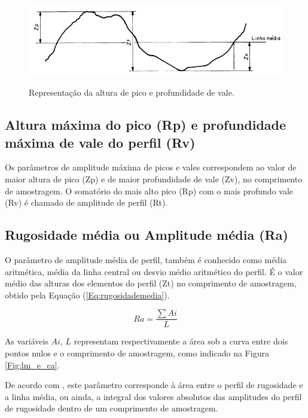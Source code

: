 \begin{figure}[!ht]
\centering
{\includegraphics[scale=0.65]{figures/alturas.jpg}}\\\caption{Representação da altura de pico e profundidade de vale.}
 \label{Fig:alturas}
\end{figure}

\subsection{Altura máxima do pico (Rp) e profundidade máxima de vale do perfil (Rv)}
Os parâmetros de amplitude máxima de picos e vales correspondem ao valor de maior altura de pico (Zp) e de maior profundidade de vale (Zv), no comprimento de amostragem. 
O somatório do mais alto pico (Rp) com o mais profundo vale (Rv) é chamado de amplitude de perfil (Rt). 

\subsection{Rugosidade média ou Amplitude média (Ra)}
O parâmetro de amplitude média de perfil, também é conhecido como média aritmética, média da linha central ou desvio médio aritmético do perfil.
É o valor médio das alturas dos elementos do perfil (Zt) no comprimento de amostragem, obtido pela Equação (\ref{Eq:rugosidademedia}).

\begin{equation}\label{Eq:rugosidademedia}
%
Ra = \frac{\sum Ai}{L}
%
\end{equation}
%

As variáveis $Ai$, $L$ representam respectivamente a área sob a curva entre dois pontos nulos e o comprimento de amostragem, como indicado na Figura \ref{Fig:lm_e_ca}. 

De acordo com , este parâmetro corresponde à área entre o perfil de rugosidade e a linha média, ou ainda, a integral dos valores absolutos das amplitudes do perfil de rugosidade dentro de um comprimento de amostragem.

